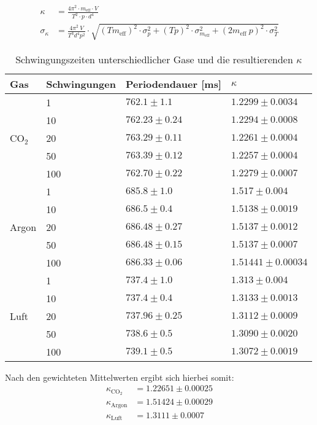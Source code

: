 \documentclass[12pt,a4paper,titlepage,headinclude,bibtotoc]{scrartcl}
\begin{document}
\begin{align*}
	\kappa&=\frac{4\pi^2 \cdot m_{\text{eff}}\cdot V }{T^{2} \cdot p \cdot d^{4}}\\
	\sigma_{\kappa}&=\frac{4\pi^2 ~ V}{T^{3}  d^{4}  p^{2}} \cdot \sqrt{\left(T  m_{\text{eff}}\right)^2 \cdot \sigma_{p}^{2} + \left(T  p\right)^2 \cdot \sigma_{m_{\text{eff}}}^{2} + \left(2m_{\text{eff}}~p\right)^{2} \cdot \sigma_{T}^{2}}
\end{align*}

\begin{table}
	\centering
	\begin{tabular}{|l|l|l|l|}
		\hline
		Gas 	&Schwingungen & Periodendauer [ms] & $\kappa$ \\\hline\hline
		
		& 1 & $762.1 \pm 1.1$ & $1.2299 \pm 0.0034$ \\
		& 10 & $762.23 \pm 0.24$ & $1.2294 \pm 0.0008$ \\
		CO$_2$
		& 20 & $763.29 \pm 0.11$ & $1.2261 \pm 0.0004$ \\
		& 50 & $763.39 \pm 0.12$ & $1.2257 \pm 0.0004$ \\
		& 100 & $762.70 \pm 0.22$ & $1.2279 \pm 0.0007$ \\\hline
		& 1 & $685.8 \pm 1.0$ & $1.517 \pm 0.004$ \\
		& 10 & $686.5 \pm 0.4$ & $1.5138 \pm 0.0019$ \\
		Argon
		& 20 & $686.48 \pm 0.27$ & $1.5137 \pm 0.0012$ \\
		& 50 & $686.48 \pm 0.15$ & $1.5137 \pm 0.0007$ \\
		& 100 & $686.33 \pm 0.06$ & $1.51441 \pm 0.00034$ \\\hline
		& 1 & $737.4 \pm 1.0$ & $1.313 \pm 0.004$ \\
		& 10 & $737.4 \pm 0.4$ & $1.3133 \pm 0.0013$ \\
		Luft
		& 20 & $737.96 \pm 0.25$ & $1.3112 \pm 0.0009$ \\
		& 50 & $738.6 \pm 0.5$ & $1.3090 \pm 0.0020$ \\
		& 100 & $739.1 \pm 0.5$ & $1.3072 \pm 0.0019$ \\\hline

	\end{tabular}
	\caption{Schwingungszeiten unterschiedlicher Gase und die resultierenden $\kappa$}
	\label{tab:schwingungszeit}
\end{table}
Nach den gewichteten Mittelwerten ergibt sich hierbei somit:
\begin{align*}
	\kappa_{\text{CO}_2}&=1.22651\pm 0.00025\\
	\kappa_\text{Argon} &=1.51424\pm 0.00029\\
	\kappa_\text{Luft}  &=1.3111\pm 0.0007
\end{align*}
\end{document}
